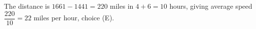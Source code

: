 The distance is $1661-1441=220$ miles in $4+6=10$ hours, giving average speed $\dfrac{220}{10}=\boxed{22}$ miles per hour, choice (E).
